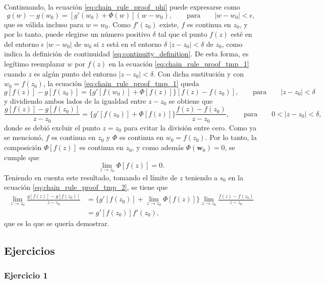 \documentclass[a4paper]{report}
\newcommand{\w}{\mathbf{w}}
\begin{document}
Continuando, la ecuación \ref{eq:chain_rule_proof_phi} puede expresarse como
\begin{equation}\label{eq:chain_rule_proof_tmp_1}
 g(w)-g(w_0)=[g'(w_0)+\Phi(w)](w-w_0),\qquad\textrm{para}\qquad|w-w_0|<\epsilon,
\end{equation}
que es válida incluso para \(w=w_0\). Como \(f'(z_0)\) existe, \(f\) es continua en \(z_0\), y por lo tanto, puede elegirse un número positivo \(\delta\) tal que el punto \(f(z)\) esté en del entorno \(\epsilon\) \(|w-w_0|\) de \(w_0\) si \(z\) está en el entorno \(\delta\) \(|z-z_0|<\delta\) de \(z_0\), como indica la definición de continuidad \ref{eq:continuity_definition}. De esta forma, es legítimo reemplazar \(w\) por \(f(z)\) en la ecuación \ref{eq:chain_rule_proof_tmp_1} cuando \(z\) es algún punto del entorno \(|z-z_0|<\delta\). Con dicha sustitución y con \(w_0=f(z_0)\), la ecuación \ref{eq:chain_rule_proof_tmp_1} queda
\[
 g[f(z)]-g[f(z_0)]=\{g'[f(w_0)]+\Phi[f(z)]\}[f(z)-f(z_0)],\qquad\textrm{para}\qquad|z-z_0|<\delta
\]
y dividiendo ambos lados de la igualdad entre \(z-z_0\) se obtiene que 
\begin{equation}\label{eq:chain_rule_proof_tmp_2}
 \frac{g[f(z)]-g[f(z_0)]}{z-z_0}=\{g'[f(z_0)]+\Phi[f(z)]\}\frac{f(z)-f(z_0)}{z-z_0},\qquad\textrm{para}\qquad0<|z-z_0|<\delta, 
\end{equation}
donde se debió excluir el punto \(z=z_0\) para evitar la división entre cero. Como ya se mencionó, \(f\) es continua en \(z_0\) y \(\Phi\) es continua en \(w_0=f(z_0)\). Por lo tanto, la composición \(\Phi[f(z)]\) es continua en \(z_0\), y como además \(\Phi(\w_0)=0\), se cumple que 
\[
 \lim_{z\to z_0}\Phi[f(z)]=0.
\]
Teniendo en cuenta este resultado, tomando el límite de \(z\) teniendo a \(s_0\) en la ecuación \ref{eq:chain_rule_proof_tmp_2}, se tiene que 
\begin{align*}
 \lim_{z\to z_0}\frac{g[f(z)]-g[f(z_0)]}{z-z_0}&=\{g'[f(z_0)]+\lim_{z\to z_0}\Phi[f(z)]\}\lim_{z\to z_0}\frac{f(z)-f(z_0)}{z-z_0}\\
  &=g'[f(z_0)]f'(z_0),
\end{align*}
que es lo que se quería demostrar.

\subsection{Ejercicios}

\subsubsection{Ejercicio 1}
\end{document}
